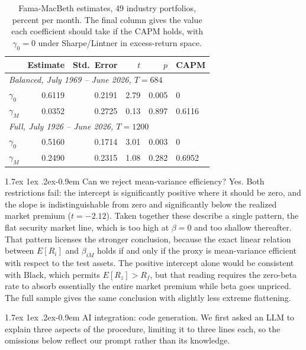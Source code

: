 \documentclass[11pt]{article}
\makeatletter
\renewcommand\paragraph{\@startsection{paragraph}{4}{0pt}%
  {1.7ex \@plus 1ex \@minus .2ex}{-0.9em}%
  {\normalfont\bfseries\normalsize\color{psink}}}
\makeatother
\begin{document}
\begin{table}[H]
\centering
\caption{Fama-MacBeth estimates, 49 industry portfolios, percent per month.
The final column gives the value each coefficient should take if the CAPM
holds, with $\gamma_0 = 0$ under Sharpe\slash Lintner in excess-return space.}
\small
\begin{tabular}{lrrrrl}
\toprule
& Estimate & Std.\ Error & $t$ & $p$ & CAPM \\
\midrule
\multicolumn{6}{l}{\textit{Balanced, July 1969 -- June 2026, $T = 684$}} \\
$\gamma_0$ & 0.6119 & 0.2191 & 2.79 & 0.005 & 0 \\
$\gamma_M$ & 0.0352 & 0.2725 & 0.13 & 0.897 & 0.6116 \\
\midrule
\multicolumn{6}{l}{\textit{Full, July 1926 -- June 2026, $T = 1200$}} \\
$\gamma_0$ & 0.5160 & 0.1714 & 3.01 & 0.003 & 0 \\
$\gamma_M$ & 0.2490 & 0.2315 & 1.08 & 0.282 & 0.6952 \\
\bottomrule
\end{tabular}
\label{tab:fmb}
\end{table}

\paragraph{Can we reject mean-variance efficiency?} Yes. Both restrictions
fail: the intercept is significantly positive where it should be zero, and the
slope is indistinguishable from zero and significantly below the realized
market premium ($t = -2.12$). Taken together these describe a single pattern,
the flat security market line, which is too high at $\beta = 0$ and too shallow
thereafter. That pattern licenses the stronger conclusion, because the exact
linear relation between $E[R_i]$ and $\beta_{iM}$ holds if and only if the
proxy is mean-variance efficient with respect to the test assets. The positive
intercept alone would be consistent with Black, which permits $E[R_z] > R_f$,
but that reading requires the zero-beta rate to absorb essentially the entire
market premium while beta goes unpriced. The full sample gives the same
conclusion with slightly less extreme flattening.

\paragraph{AI integration: code generation.} We first asked an LLM to explain
three aspects of the procedure, limiting it to three lines each, so the
omissions below reflect our prompt rather than its knowledge.
\end{document}
